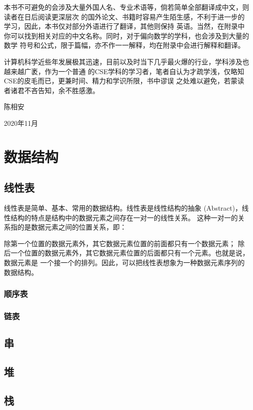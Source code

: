 \documentclass[UTF8]{ctexbook}
\begin{document}
            本书不可避免的会涉及大量外国人名、专业术语等，倘若简单全部翻译成中文，则读者在日后阅读更深层次
            的国外论文、书籍时容易产生陌生感，不利于进一步的学习，因此，本书仅对部分外语进行了翻译，其他则保持
            英语。当然，在附录中你可以找到相关对应的中文名称。同时，对于偏向数学的学科，也会涉及到大量的数学
            符号和公式，限于篇幅，亦不作一一解释，均在附录中会进行解释和翻译。

            计算机科学近些年发展极其迅速，目前以及时当下几乎最火爆的行业，学科涉及也越来越广袤，作为一个普通
            的CSE学科的学习者，笔者自认为才疏学浅，仅略知CSE的皮毛而已，更兼时间、精力和学识所限，书中谬误
            之处难以避免，若蒙读者诸君不吝告知，余不胜感激。

            陈相安

            2020年11月
    \chapter{数据结构}
        \section{线性表}
        线性表是简单、基本、常用的数据结构。线性表是线性结构的抽象 (Abstract)，线性结构的特点是结构中的数据元素之间存在一对一的线性关系。
        这种一对一的关系指的是数据元素之间的位置关系，即：

        除第一个位置的数据元素外，其它数据元素位置的前面都只有一个数据元素；
        除后一个位置的数据元素外，其它数据元素位置的后面都只有一个元素。也就是说，数据元素是 一个接一个的排列。因此，可以把线性表想象为一种数据元素序列的数据结构。
            \subsection{顺序表}
            \subsection{链表}
        \section{串}
        \section{堆}
        \section{栈}
\end{document}
